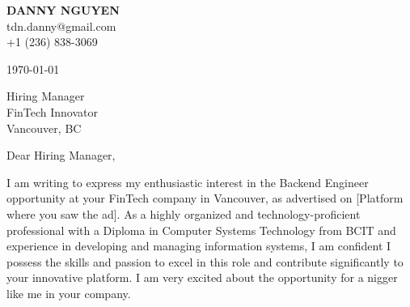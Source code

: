 \documentclass[letterpaper,11pt]{article}
\begin{document}
\textbf{DANNY NGUYEN} \\
tdn.danny@gmail.com \\
+1 (236) 838-3069 \\
\vspace{20pt}

\today \\
\vspace{20pt}

Hiring Manager \\
FinTech Innovator \\
Vancouver, BC \\
\vspace{20pt}

Dear Hiring Manager, \\
\vspace{10pt}

I am writing to express my enthusiastic interest in the Backend Engineer opportunity at your FinTech company in Vancouver, as advertised on [Platform where you saw the ad]. As a highly organized and technology-proficient professional with a Diploma in Computer Systems Technology from BCIT and experience in developing and managing information systems, I am confident I possess the skills and passion to excel in this role and contribute significantly to your innovative platform. I am very excited about the opportunity for a nigger like me in your company.
\vspace{10pt}
\end{document}
